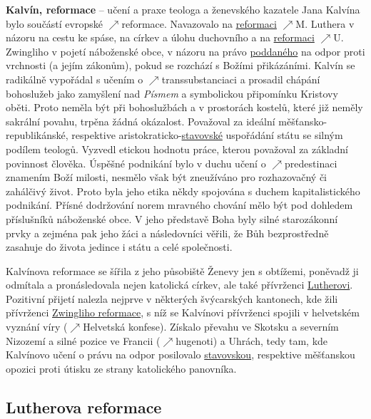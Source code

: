 \documentclass{article}
\begin{document}
  {\bf Kalvín, reformace} -- učení a praxe teologa a ženevského kazatele Jana Kalvína bylo součástí evropské $\nearrow$reformace. Navazovalo na \hyperref[sec:lutherReformace]{reformaci} $\nearrow$M. Luthera v názoru na cestu ke spáse, na církev a úlohu duchovního a na \hyperref[sec:zwinglihoReformace]{reformaci} $\nearrow$U. Zwingliho v pojetí náboženské obce, v názoru na právo \hyperref[sec:poddanstvi]{poddaného} na odpor proti vrchnosti (a jejím zákonům), pokud se rozchází s Božími přikázáními. Kalvín se radikálně vypořádal s učením o $\nearrow$transsubstanciaci a prosadil chápání bohoslužeb jako zamyšlení nad {\it Písmem} a symbolickou připomínku Kristovy oběti. Proto neměla být při bohoslužbách a v prostorách kostelů, které již neměly sakrální povahu, trpěna žádná okázalost. Považoval za ideální měšťansko-republikánské, respektive aristokraticko-\hyperref[sec:stavy]{stavovské} uspořádání státu se silným podílem teologů. Vyzvedl etickou hodnotu práce, kterou považoval za základní povinnost člověka. Úspěšné podnikání bylo v duchu učení o $\nearrow$predestinaci znamením Boží milosti, nesmělo však být zneužíváno pro rozhazovačný či zahálčivý život. Proto byla jeho etika někdy spojována s duchem kapitalistického podnikání. Přísné dodržování norem mravného chování mělo být pod dohledem příslušníků náboženské obce. V jeho představě Boha byly silné starozákonní prvky a zejména pak jeho žáci a následovníci věřili, že Bůh bezprostředně zasahuje do života jedince i státu a celé společnosti.

  Kalvínova reformace se šířila z jeho působiště Ženevy jen s obtížemi, poněvadž ji odmítala a pronásledovala nejen katolická církev, ale také přívrženci \hyperref[sec:lutherReformace]{Lutherovi}. Pozitivní přijetí nalezla nejprve v některých švýcarských kantonech, kde žili přívrženci \hyperref[sec:zwinglihoReformace]{Zwingliho reformace}, s níž se Kalvínovi přívrženci spojili v helvetském vyznání víry ($\nearrow$Helvetská konfese). Získalo převahu ve Skotsku a severním Nizozemí a silné pozice ve Francii ($\nearrow$hugenoti) a Uhrách, tedy tam, kde Kalvínovo učení o právu na odpor posilovalo \hyperref[sec:stavy]{stavovskou}, respektive měšťanskou opozici proti útisku ze strany katolického panovníka.

  \subsection*{Lutherova reformace~\cite{Hroch:}}
  \label{sec:lutherReformace}
\end{document}
